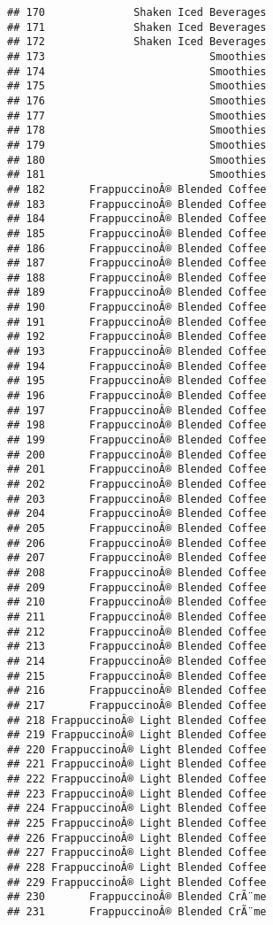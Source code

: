 \documentclass[
]{article}
\begin{document}
\begin{verbatim}
## 170              Shaken Iced Beverages
## 171              Shaken Iced Beverages
## 172              Shaken Iced Beverages
## 173                          Smoothies
## 174                          Smoothies
## 175                          Smoothies
## 176                          Smoothies
## 177                          Smoothies
## 178                          Smoothies
## 179                          Smoothies
## 180                          Smoothies
## 181                          Smoothies
## 182       FrappuccinoÂ® Blended Coffee
## 183       FrappuccinoÂ® Blended Coffee
## 184       FrappuccinoÂ® Blended Coffee
## 185       FrappuccinoÂ® Blended Coffee
## 186       FrappuccinoÂ® Blended Coffee
## 187       FrappuccinoÂ® Blended Coffee
## 188       FrappuccinoÂ® Blended Coffee
## 189       FrappuccinoÂ® Blended Coffee
## 190       FrappuccinoÂ® Blended Coffee
## 191       FrappuccinoÂ® Blended Coffee
## 192       FrappuccinoÂ® Blended Coffee
## 193       FrappuccinoÂ® Blended Coffee
## 194       FrappuccinoÂ® Blended Coffee
## 195       FrappuccinoÂ® Blended Coffee
## 196       FrappuccinoÂ® Blended Coffee
## 197       FrappuccinoÂ® Blended Coffee
## 198       FrappuccinoÂ® Blended Coffee
## 199       FrappuccinoÂ® Blended Coffee
## 200       FrappuccinoÂ® Blended Coffee
## 201       FrappuccinoÂ® Blended Coffee
## 202       FrappuccinoÂ® Blended Coffee
## 203       FrappuccinoÂ® Blended Coffee
## 204       FrappuccinoÂ® Blended Coffee
## 205       FrappuccinoÂ® Blended Coffee
## 206       FrappuccinoÂ® Blended Coffee
## 207       FrappuccinoÂ® Blended Coffee
## 208       FrappuccinoÂ® Blended Coffee
## 209       FrappuccinoÂ® Blended Coffee
## 210       FrappuccinoÂ® Blended Coffee
## 211       FrappuccinoÂ® Blended Coffee
## 212       FrappuccinoÂ® Blended Coffee
## 213       FrappuccinoÂ® Blended Coffee
## 214       FrappuccinoÂ® Blended Coffee
## 215       FrappuccinoÂ® Blended Coffee
## 216       FrappuccinoÂ® Blended Coffee
## 217       FrappuccinoÂ® Blended Coffee
## 218 FrappuccinoÂ® Light Blended Coffee
## 219 FrappuccinoÂ® Light Blended Coffee
## 220 FrappuccinoÂ® Light Blended Coffee
## 221 FrappuccinoÂ® Light Blended Coffee
## 222 FrappuccinoÂ® Light Blended Coffee
## 223 FrappuccinoÂ® Light Blended Coffee
## 224 FrappuccinoÂ® Light Blended Coffee
## 225 FrappuccinoÂ® Light Blended Coffee
## 226 FrappuccinoÂ® Light Blended Coffee
## 227 FrappuccinoÂ® Light Blended Coffee
## 228 FrappuccinoÂ® Light Blended Coffee
## 229 FrappuccinoÂ® Light Blended Coffee
## 230       FrappuccinoÂ® Blended CrÃ¨me
## 231       FrappuccinoÂ® Blended CrÃ¨me

\end{verbatim}
\end{document}
